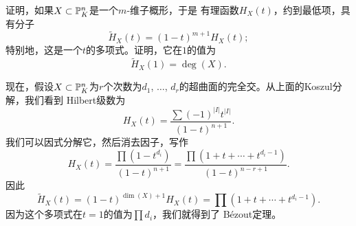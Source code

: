 \begin{exe}\label{exe:3.83}
	证明，如果$X\subset \P_K^n$是一个$m$-维子概形，于是
	有理函数$H_X(t)$，约到最低项，具有分子
	\[
		\tilde{H}_X(t)=(1-t)^{m+1}H_X(t);
	\]
	特别地，这是一个$t$的多项式。证明，它在$1$的值为
	\[
		\tilde{H}_X(1)=\deg(X).
	\]
\end{exe}

现在，假设$X\subset \P_K^n$为$r$个次数为$d_1$, $\dots$, 
$d_r$的超曲面的完全交。从上面的Koszul分解，我们看到
Hilbert级数为
\[
	H_X(t)=\frac{\sum (-1)^{|I|}t^{|I|}}{(1-t)^{n+1}}.
\]
我们可以因式分解它，然后消去因子，写作
\[
	H_X(t)=\frac{\prod (1-t^{d_i})}{(1-t)^{n+1}}
	=\frac{\prod (1+t+\cdots+t^{d_{i}-1})}{(1-t)^{n-r+1}}.
\]
因此
\[
	\tilde{H}_X(t)=(1-t)^{\dim(X)+1}H_X(t)=
	\prod (1+t+\cdots+t^{d_{i}-1}).
\]
因为这个多项式在$t=1$的值为$\prod d_i$，我们就得到了
B\'ezout定理。